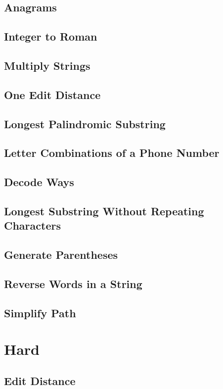 \documentclass[11pt]{book}
\begin{document}
\subsection{Anagrams}
\label{sec-2-2-2}
\subsection{Integer to Roman}
\label{sec-2-2-3}
\subsection{Multiply Strings}
\label{sec-2-2-4}
\subsection{One Edit Distance}
\label{sec-2-2-5}
\subsection{Longest Palindromic Substring}
\label{sec-2-2-6}
\subsection{Letter Combinations of a Phone Number}
\label{sec-2-2-7}
\subsection{Decode Ways}
\label{sec-2-2-8}
\subsection{Longest Substring Without Repeating Characters}
\label{sec-2-2-9}
\subsection{Generate Parentheses}
\label{sec-2-2-10}
\subsection{Reverse Words in a String}
\label{sec-2-2-11}
\subsection{Simplify Path}
\label{sec-2-2-12}
\section{Hard}
\label{sec-2-3}
\subsection{Edit Distance}
\label{sec-2-3-1}
\end{document}
